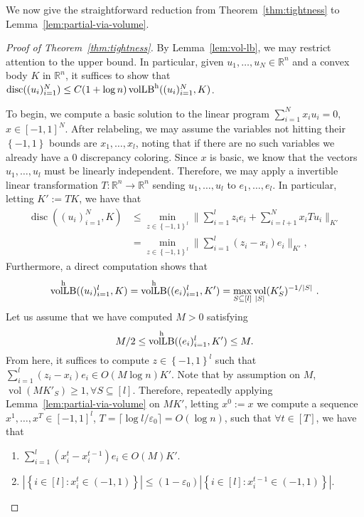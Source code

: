 \documentclass[11pt]{article}
\newcommand{\R}{{\mathbb{R}}}
\newcommand\eps{\varepsilon}
\newcommand{\set}[1]{\left\{ #1 \right\}}
\DeclareMathOperator{\vollb}{volLB}
\DeclareMathOperator{\disc}{disc}
\DeclareMathOperator{\vol}{vol}
\begin{document}
We now give the straightforward reduction from Theorem~\ref{thm:tightness} to
Lemma~\ref{lem:partial-via-volume}.

\begin{proof}[Proof of Theorem~\ref{thm:tightness}]
By Lemma~\ref{lem:vol-lb}, we may restrict attention to the upper bound. In
particular, given $u_1,\dots,u_N \in \R^n$ and a convex body $K$ in $\R^n$, it
suffices to show that $\disc((u_i)_{i=1}^N) \leq C(1+\log n)\vollb^{\rm
h}((u_i)_{i=1}^N,K)$.  

To begin, we compute a basic solution to the linear program $\sum_{i=1}^N x_i
u_i = 0$, $x \in [-1,1]^N$. After relabeling, we may assume the variables not
hitting their $\set{-1,1}$ bounds are $x_1,\dots,x_l$, noting that if there are
no such variables we already have a $0$ discrepancy coloring. Since
$x$ is basic, we know that the vectors $u_1,\dots,u_l$ must be linearly
independent. Therefore, we may apply a invertible linear
transformation $T:\R^n \rightarrow \R^n$ sending $u_1,\dots,u_l$ to
$e_1,\dots,e_l$. In particular, letting $K' := TK$, we have that 
\begin{align*}
\disc((u_i)_{i=1}^N,K) &\leq \min_{z \in \set{-1,1}^l} \|\sum_{i=1}^l z_i e_i +
\sum_{i=l+1}^N x_i T u_i\|_{K'} \\
                &= \min_{z \in \set{-1,1}^l} \|\sum_{i=1}^l (z_i-x_i)e_i\|_{K'}, 
\end{align*}
Furthermore, a direct computation shows that
\[
\vollb^{\rm h}((u_i)_{i=1}^l,K) = \vollb^{\rm h}((e_i)_{i=1}^l,K') = \max_{S \subseteq [l]}
\vol_{|S|}(K'_S)^{-1/|S|} \text{ .}
\] 
Let us assume that we have computed $M > 0$ satisfying 
\[
M/2 \leq \vollb^{\rm h}((e_i)_{i=1}^l,K') \leq M. 
\]
From here, it suffices to compute $z \in
\set{-1,1}^l$ such that $\sum_{i=1}^l (z_i-x_i) e_i \in O(M\log n) K'$. Note
that by assumption on $M$, $\vol(MK'_S) \geq 1, \forall S \subseteq [l]$.
Therefore, repeatedly applying Lemma~\ref{lem:partial-via-volume} on $MK'$, letting $x^0 := x$ we compute a sequence
$x^1,\dots,x^T \in [-1,1]^l$, $T = \lceil \log l/\eps_0
\rceil = O(\log n)$, such that $\forall t \in [T]$, we have that

\begin{enumerate}
\item $\sum_{i=1}^l (x^t_i-x^{t-1}_i)e_i \in O(M) K'$.
\item $|\set{i \in [l]: x^t_i \in (-1,1)}| \leq (1-\eps_0)|\set{i \in [l]:
x^{t-1}_i \in (-1,1)}|$.
\end{enumerate}


\end{proof}
\end{document}

